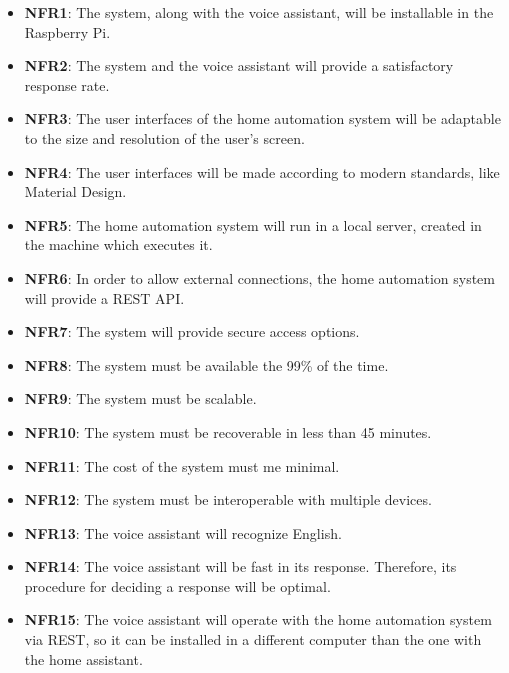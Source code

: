 \begin{itemize}
	\item \textbf{NFR1}: The system, along with the voice assistant, will be installable in the Raspberry Pi.
	\item \textbf{NFR2}: The system and the voice assistant will provide a satisfactory response rate.
	\item \textbf{NFR3}: The user interfaces of the home automation system will be adaptable to the size and resolution of the
	user's screen.
	\item \textbf{NFR4}: The user interfaces will be made according to modern standards, like Material Design.
	\item \textbf{NFR5}: The home automation system will run in a local server, created in the machine which executes it.
	\item \textbf{NFR6}: In order to allow external connections, the home automation system will provide a REST API.
	\item \textbf{NFR7}: The system will provide secure access options.
	\item \textbf{NFR8}: The system must be available the 99\% of the time.
	\item \textbf{NFR9}: The system must be scalable.
	\item \textbf{NFR10}: The system must be recoverable in less than 45 minutes.
	\item \textbf{NFR11}: The cost of the system must me minimal.
	\item \textbf{NFR12}: The system must be interoperable with multiple devices.
	\item \textbf{NFR13}: The voice assistant will recognize English.
	\item \textbf{NFR14}: The voice assistant will be fast in its response. Therefore, its procedure for deciding a response will 
	be optimal.
	\item \textbf{NFR15}: The voice assistant will operate with the home automation system via REST, so it can be installed in a
	different computer than the one with the home assistant.
\end{itemize}
